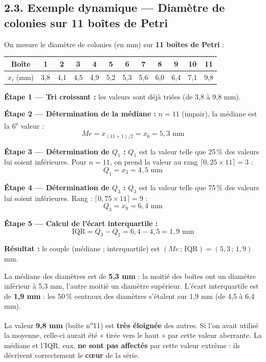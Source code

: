 \documentclass[11pt,a4paper]{article}
\begin{document}
\vspace{0.3cm}

\subsection*{2.3. Exemple dynamique — Diamètre de colonies sur 11 boîtes de Petri}

\begin{exemple}
On mesure le diamètre de colonies (en mm) sur \textbf{11 boîtes de Petri} :

\begin{center}
\begin{tabular}{|c|c|c|c|c|c|c|c|c|c|c|c|}
\hline
Boîte & 1 & 2 & 3 & 4 & 5 & 6 & 7 & 8 & 9 & 10 & 11 \\
\hline
$x_i$ (mm) & 3{,}8 & 4{,}1 & 4{,}5 & 4{,}9 & 5{,}2 & 5{,}3 & 5{,}6 & 6{,}0 & 6{,}4 & 7{,}1 & 9{,}8 \\
\hline
\end{tabular}
\end{center}

\vspace{0.2cm}
\textbf{Étape 1 — Tri croissant :} les valeurs sont déjà triées (de 3,8 à 9,8 mm).

\textbf{Étape 2 — Détermination de la médiane :} $n = 11$ (impair), la médiane est la 6\textsuperscript{e} valeur :
\[
Me = x_{(11+1)/2} = x_6 = 5{,}3 \text{ mm}
\]

\textbf{Étape 3 — Détermination de $Q_1$ :} $Q_1$ est la valeur telle que 25\,\% des valeurs lui soient inférieures. Pour $n = 11$, on prend la valeur au rang $\lceil 0{,}25 \times 11 \rceil = 3$ :
\[
Q_1 = x_3 = 4{,}5 \text{ mm}
\]

\textbf{Étape 4 — Détermination de $Q_3$ :} $Q_3$ est la valeur telle que 75\,\% des valeurs lui soient inférieures. Rang : $\lceil 0{,}75 \times 11 \rceil = 9$ :
\[
Q_3 = x_9 = 6{,}4 \text{ mm}
\]

\textbf{Étape 5 — Calcul de l'écart interquartile :}
\[
\text{IQR} = Q_3 - Q_1 = 6{,}4 - 4{,}5 = 1{,}9 \text{ mm}
\]

\textbf{Résultat :} le couple (médiane ; interquartile) est $\boxed{(Me \,;\, \text{IQR}) = (5{,}3 \,;\, 1{,}9)}$ mm.
\end{exemple}

\begin{interpretation}
La médiane des diamètres est de \textbf{5,3 mm} : la moitié des boîtes ont un diamètre inférieur à 5,3 mm, l'autre moitié un diamètre supérieur. L'écart interquartile est de \textbf{1,9 mm} : les 50\,\% centraux des diamètres s'étalent sur 1,9 mm (de 4,5 à 6,4 mm).

\vspace{0.2cm}
La valeur \textbf{9,8 mm} (boîte n\textsuperscript{o}11) est \textbf{très éloignée} des autres. Si l'on avait utilisé la moyenne, celle-ci aurait été « tirée vers le haut » par cette valeur aberrante. La médiane et l'IQR, eux, \textbf{ne sont pas affectés} par cette valeur extrême : ils décrivent correctement le \textbf{cœur} de la série.
\end{interpretation}
\end{document}
